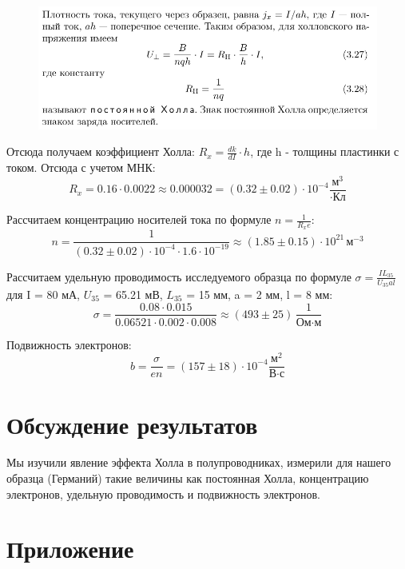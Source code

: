 \documentclass[a4paper, 10pt, twocolumn]{article}
\begin{document}
    \begin{figure}[H]
        \centering
        \includegraphics[width=1\linewidth]{images/theory.png}
    \end{figure}
    Отсюда получаем коэффициент Холла: $R_x = \frac{dk}{dI} \cdot h$, где h - толщины пластинки с током. \newline
    Отсюда с учетом МНК:
    $$R_x = 0.16 \cdot 0.0022 \approx 0.000032 = (0.32 \pm 0.02) \cdot 10^{-4} \frac{\text{м}^3}{\cdot \text{Кл}} $$

    Рассчитаем концентрацию носителей тока по формуле $n = \frac{1}{R_x e}$:
    $$n = \frac{1}{(0.32 \pm 0.02) \cdot 10^{-4} \cdot 1.6 \cdot 10^{-19}} \approx (1.85 \pm 0.15) \cdot 10^{21} \, \text{м}^{-3}$$

    Рассчитаем удельную проводимость исследуемого образца по формуле $\sigma = \frac{I L_{35}}{U_{35} a l}$ для I = 80 мА, $U_{35}$ = 65.21 мВ, $L_{35}$ = 15 мм, a = 2 мм, l = 8 мм:
    $$\sigma = \frac{0.08 \cdot 0.015}{0.06521 \cdot 0.002 \cdot 0.008} \approx (493 \pm 25) \, \frac{1}{\text{Ом} \cdot \text{м}}$$

    Подвижность электронов:
    $$b = \frac{\sigma}{en} = (157 \pm 18) \cdot 10^{-4}\frac{\text{м}^2}{\text{В}\cdot\text{с}}$$




\section{Обсуждение результатов}
    Мы изучили явление эффекта Холла в полупроводниках, измерили для нашего образца (Германий) такие величины как постоянная Холла, концентрацию электронов, удельную проводимость и подвижность электронов.
    \newpage
\onecolumn
\section{Приложение}
\end{document}
